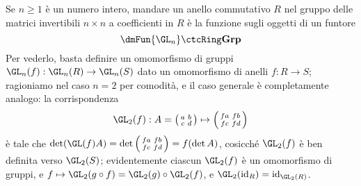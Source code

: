 \begin{example}
	Se $n\ge 1$ è un numero intero, mandare un anello commutativo $R$ nel gruppo delle matrici invertibili $n\times n$ a coefficienti in $R$ è la funzione sugli oggetti di un funtore 
	\[\dmFun{\GL_n}\ctcRing\ctGrp\]
	Per vederlo, basta definire un omomorfismo di gruppi $\GL_n(f) : \GL_n(R)\to \GL_n(S)$ dato un omomorfismo di anelli $f : R\to S$; ragioniamo nel caso $n=2$ per comodità, e il caso generale è completamente analogo: la corrispondenza
	\[\GL_2(f) : A=\left(\begin{smallmatrix}
		a	&	b \\ 
		c	&	d
		\end{smallmatrix}\right)
		\mapsto 
		\left(\begin{smallmatrix}
			fa	&	fb \\ 
			fc	&	fd
			\end{smallmatrix}\right)
			\]
			è tale che $\det(\GL(f)A)=\det\left(\begin{smallmatrix}
				fa	&	fb \\ 
				fc	&	fd
				\end{smallmatrix}\right) = f(\det A)$, cosicché $\GL_2(f)$ è ben definita verso $\GL_2(S)$; evidentemente ciascun $\GL_2(f)$ è un omomorfismo di gruppi, e $f\mapsto\GL_2(g\circ f) = \GL_2(g)\circ\GL_2(f)$, e $\GL_2(\id_R) = \id_{\GL_2(R)}$.
\end{example}
